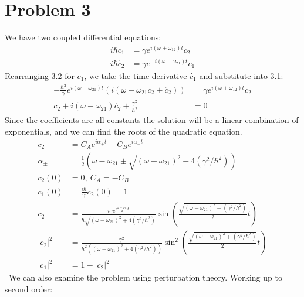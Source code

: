 \documentclass[a4paper,11pt]{article}
\numberwithin{equation}{section}
\begin{document}
\section{Problem 3}
We have two coupled differential equations:
\begin{align}
 i \hbar \dot{c_1} &= \gamma e^{i(\omega+\omega_{12}) t}c_2\\
 i \hbar \dot{c_2} &= \gamma e^{-i(\omega-\omega_{21}) t}c_1
\end{align}
Rearranging 3.2 for $c_1$, we take the time derivative $\dot{c_1}$ and substitute into 3.1:
\begin{align}
 -\frac{\hbar^2}{\gamma}e^{i(\omega-\omega_{21})t}(i(\omega-\omega_{21}\dot{c_2}+\ddot{c_2}) ) &= \gamma e^{i(\omega+\omega_{12})t}c_2\\
 \ddot{c_2}+i(\omega-\omega_{21})\dot{c_2}+\frac{\gamma^2}{\hbar^2} &= 0
\end{align}
Since the coefficients are all constants the solution will be a linear combination of exponentials, and we can find the roots of the quadratic equation.
\begin{align}
 c_2 &= C_Ae^{i\alpha_+ t}+C_Be^{i\alpha_- t}\\
 \alpha_\pm &= \frac{1}{2}\left( \omega-\omega_{21} \pm \sqrt{(\omega-\omega_{21})^2-4(\gamma^2/\hbar^2)} \right)\\
 c_2(0) &=0,\ C_A=-C_B\\
 c_1(0) & =\frac{i\hbar}{\gamma}\dot{c_2}(0)=1\\
 c_2 &= \frac{ i\gamma e^{i\frac{\omega-\omega_{21}}{2}t} }{\hbar\sqrt{(\omega-\omega_{21})^2+4(\gamma^2/\hbar^2)}}
      \sin{\left(\frac{\sqrt{(\omega-\omega_{21})^2+(\gamma^2/\hbar^2)}}{2}t \right)}\\
 |c_2|^2 &= \frac{\gamma^2}{\hbar^2((\omega-\omega_{21})^2+4(\gamma^2/\hbar^2))}
      \sin^2{\left(\frac{\sqrt{(\omega-\omega_{21})^2+(\gamma^2/\hbar^2)}}{2}t \right)}\\
 |c_1|^2 &= 1-|c_2|^2
\end{align}
\
We can also examine the problem using perturbation theory. Working up to second order:
\end{document}
